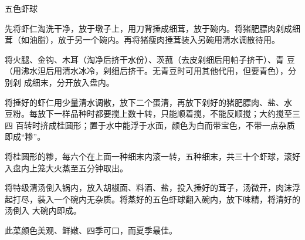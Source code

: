 \begin{recipe}{五色虾球}

\ingredients


\preparation

\step 先将虾仁淘洗干净，放于墩子上，用刀背捶成细茸，放于碗内。将猪肥膘肉剁成细
茸（如油脂），放于另一个碗内。再将猪瘦肉捶茸装入另碗用清水调散待用。

\step 将火腿、金钩、木耳（淘净后挤干水份）、茨菰（去皮剁细后用帕子挤干）、青
豆（用沸水泹后用清水冰冷，剁细后挤干。无青豆时可用其他代用，但要青色），分别剁
成细末，分开放入盘内。

\step 将捶好的虾仁用少量清水调散，放下二个蛋清，再放下剁好的猪肥膘肉、盐、水
豆粉。每放下一样品种时都要搅上数十转，只能顺着搅，不能反顺搅；大约搅至三四
百转时挤成桂圆形；置于水中能浮于水面，颜色为白而带宝色，不带一点杂质即成“糁”。

\step 将桂圆形的糁，每六个在上面一种细末内滚一转，五种细末，共三十个虾球，滚好
入盘内上笼大火蒸至五分钟取出。

\step 将特级清汤倒入锅内，放入胡椒面、料酒、盐，投入捶好的茸子，汤微开，肉沫浮
起打尽，装入一个碗内无杂质。将蒸好的五色虾球翻入碗内，放下味精，将清好的汤倒入
大碗内即成。

\features

此菜颜色美观、鲜嫩、四季可口，而夏季最佳。

\end{recipe}

